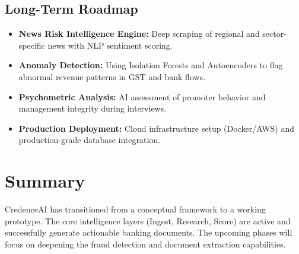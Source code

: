 \documentclass[11pt]{article}
\begin{document}
\subsection{Long-Term Roadmap}
\begin{itemize}[noitemsep]
    \item \textbf{News Risk Intelligence Engine:} Deep scraping of regional and sector-specific news with NLP sentiment scoring.
    \item \textbf{Anomaly Detection:} Using Isolation Forests and Autoencoders to flag abnormal revenue patterns in GST and bank flows.
    \item \textbf{Psychometric Analysis:} AI assessment of promoter behavior and management integrity during interviews.
    \item \textbf{Production Deployment:} Cloud infrastructure setup (Docker/AWS) and production-grade database integration.
\end{itemize}

\section{Summary}
CredenceAI has transitioned from a conceptual framework to a working prototype. The core intelligence layers (Ingest, Research, Score) are active and successfully generate actionable banking documents. The upcoming phases will focus on deepening the fraud detection and document extraction capabilities.
\end{document}
